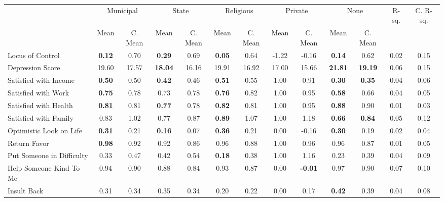 \begin{tabular}{l c c c c c c c c c c c c}
\toprule
& \multicolumn{2}{c}{Municipal} & \multicolumn{2}{c}{State} & \multicolumn{2}{c}{Religious} & \multicolumn{2}{c}{Private} & \multicolumn{2}{c}{None} & R-sq. & C. R-sq. \\
& \scriptsize Mean & \scriptsize C. Mean & \scriptsize Mean & \scriptsize C. Mean & \scriptsize Mean & \scriptsize C. Mean & \scriptsize Mean & \scriptsize C. Mean & \scriptsize Mean & \scriptsize C. Mean & & \\
\midrule
Locus of Control & \textbf{     0.12} & 0.70 & \textbf{     0.29} & 0.69 & \textbf{     0.05} & 0.64 &     -1.22 & -0.16 & \textbf{     0.14} & 0.62 &      0.02 &      0.15 \\
Depression Score &     19.60 & 17.57 & \textbf{    18.04} & 16.16 &     19.91 & 16.92 &     17.00 & 15.66 & \textbf{    21.81} & \textbf{    19.19} &      0.06 &      0.15 \\
Satisfied with Income & \textbf{     0.50} & 0.50 & \textbf{     0.42} & 0.46 & \textbf{     0.51} & 0.55 &      1.00 & 0.91 & \textbf{     0.30} & \textbf{     0.35} &      0.04 &      0.06 \\
Satisfied with Work & \textbf{     0.75} & 0.78 &      0.73 & 0.78 & \textbf{     0.76} & 0.82 &      1.00 & 0.95 & \textbf{     0.58} & 0.66 &      0.04 &      0.05 \\
Satisfied with Health & \textbf{     0.81} & 0.81 & \textbf{     0.77} & 0.78 & \textbf{     0.82} & 0.81 &      1.00 & 0.95 & \textbf{     0.88} & 0.90 &      0.01 &      0.03 \\
Satisfied with Family &      0.83 & 1.02 &      0.77 & 0.87 & \textbf{     0.89} & 1.07 &      1.00 & 1.18 & \textbf{     0.66} & \textbf{     0.84} &      0.05 &      0.12 \\
Optimistic Look on Life & \textbf{     0.31} & 0.21 & \textbf{     0.16} & 0.07 & \textbf{     0.36} & 0.21 &      0.00 & -0.16 & \textbf{     0.30} & 0.19 &      0.02 &      0.04 \\
Return Favor & \textbf{     0.98} & 0.92 &      0.92 & 0.86 &      0.96 & 0.88 &      1.00 & 0.96 &      0.96 & 0.87 &      0.01 &      0.05 \\
Put Someone in Difficulty &      0.33 & 0.47 &      0.42 & 0.54 & \textbf{     0.18} & 0.38 &      1.00 & 1.16 &      0.23 & 0.39 &      0.04 &      0.09 \\
Help Someone Kind To Me &      0.94 & 0.90 &      0.88 & 0.84 &      0.93 & 0.87 &      0.00 & \textbf{    -0.01} &      0.97 & 0.90 &      0.07 &      0.10 \\
Insult Back &      0.31 & 0.34 &      0.35 & 0.34 &      0.20 & 0.22 &      0.00 & 0.17 & \textbf{     0.42} & 0.39 &      0.04 &      0.08 \\
\bottomrule
\end{tabular}
